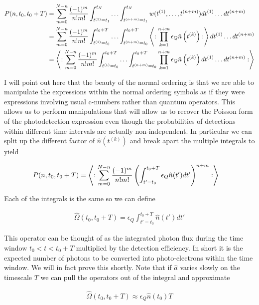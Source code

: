 \documentclass[12pt]{article}
\begin{document}
\begin{align}
P(n,t_0,t_0+T) &= \sum_{m=0}^{N-n}\frac{(-1)^m}{n! m!} \int_{t^{(1)}=t_1}^{t_N} \ldots \int_{t^{(n+m)}=t_1}^{t_N} w(t^{(1)},\ldots ,t^{(n+m)}) dt^{(1)} \ldots dt^{(n+m)}\\
&= \sum_{m=0}^{N-n}\frac{(-1)^m}{n! m!} \int_{t^{(1)}=t_0}^{t_0+T} \ldots \int_{t^{(n+m)}=t_0}^{t_0+T} \Braket{:\prod_{k=1}^{n+m} \epsilon_Q \hat{n}\left(t^{(k)}\right) :} dt^{(1)} \ldots dt^{(n+m)}\\
&= \Braket{: \sum_{m=0}^{N-n}\frac{(-1)^m}{n! m!} \int_{t^{(1)}=t_0}^{t_0+T} \ldots \int_{t^{(n+m)}=t_0}^{t_0+T} \prod_{k=1}^{n+m} \epsilon_Q \hat{n}\left(t^{(k)}\right) dt^{(1)} \ldots dt^{(n+m)}:}
\end{align}

 I will point out here that the beauty of the normal ordering is that we are able to manipulate the expressions within the normal ordering symbols as if they were expressions involving usual c-numbers rather than quantum operators. This allows us to perform manipulations that will allow us to recover the Poisson form of the photodetection expression even though the probabilities of detections within different time intervals are actually non-independent. In particular we can split up the different factor of $\hat{n}\left(t^{(k)}\right)$ and break apart the multiple integrals to yield
 
 \begin{align}
 P(n,t_0,t_0+T) &= \Braket{: \sum_{m=0}^{N-n}\frac{(-1)^m}{n! m!} \left(\int_{t'=t_0}^{t_0+T} \epsilon_Q \hat{n}(t') dt'\right)^{n+m} :}
 \end{align}

Each of the integrals is the same so we can define

\begin{align}
\hat{\Omega}(t_0,t_0+T) = \epsilon_Q \int_{t' = t_0}^{t_0+T} \hat{n}(t')dt'
\end{align}

This operator can be thought of as the integrated photon flux during the time window $t_0 < t< t_0+T$ multiplied by the detection efficiency. In short it is the expected number of photons to be converted into photo-electrons within the time window. We will in fact prove this shortly. Note that if $\hat{a}$ varies slowly on the timescale $T$ we can pull the operators out of the integral and approximate

\begin{align}
\hat{\Omega}(t_0,t_0+T) \approx \epsilon_Q \hat{n}(t_0)T
\end{align}
\end{document}
